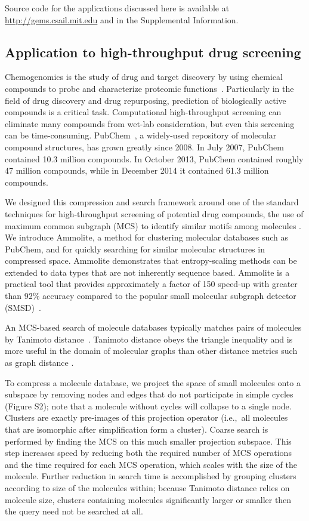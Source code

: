 \documentclass[review,preprint,12pt]{elsarticle}
\renewcommand{\cite}{\citep} %
\theoremstyle{definition}
\theoremstyle{remark}
\numberwithin{equation}{section}
\begin{document}
Source code for the applications discussed here is available at \url{http://gems.csail.mit.edu} and in the Supplemental Information.

\subsection{Application to high-throughput drug screening}

Chemogenomics is the study of drug and target discovery by using chemical
compounds to probe and characterize proteomic 
functions~\cite{bredel2004chemogenomics}.
Particularly in the field of drug discovery and drug repurposing, prediction 
of biologically active compounds is a critical task. 
Computational high-throughput screening can eliminate many compounds from 
wet-lab consideration, but even this screening can be time-consuming.
PubChem~\cite{bolton2008pubchem}, a widely-used repository of molecular compound 
structures, 
has grown greatly since 2008. 
In July 2007, PubChem contained 10.3 million compounds.
In October 2013, PubChem contained roughly 47 million compounds, while
in December 2014 it contained 61.3 million compounds.

We designed this compression and search framework around one of the standard 
techniques for high-throughput screening of potential drug compounds, the use 
of maximum common subgraph (MCS) to identify similar motifs among molecules \cite{cao2008maximum, rahman2009small}.
We introduce Ammolite, a method for clustering molecular databases such as 
PubChem, and for quickly searching for 
similar molecular structures in compressed space.
Ammolite demonstrates that entropy-scaling methods can be extended to data types that are not inherently sequence based.
Ammolite is a practical 
tool that provides approximately a factor of 150 speed-up with greater than 92\% accuracy compared to the popular small molecular subgraph detector (SMSD)~\cite{rahman2009small}.

An MCS-based search of molecule databases typically matches pairs of molecules by 
Tanimoto distance~\cite{rahman2009small}. 
Tanimoto distance obeys the triangle inequality and is more useful in the 
domain of molecular graphs than other
distance metrics such as graph distance \cite{bunke1998graph}.

To compress a molecule database, we project the space of small molecules onto a subspace by removing nodes and edges that do not participate in simple cycles
(Figure S2);
note that a molecule without cycles will collapse to a single node.
Clusters are exactly pre-images of this projection operator (i.e.,~all molecules that are isomorphic after simplification form a cluster).
Coarse search is performed by finding the MCS on this much smaller projection subspace.
This step increases speed by reducing both the required number of MCS operations 
and the time required for each MCS operation, which scales with the size of the molecule.
Further reduction in search time is accomplished by grouping clusters according
to size of the molecules within; because Tanimoto distance relies on molecule
size, clusters containing molecules significantly larger or smaller then the
query need not be searched at all.
\end{document}
